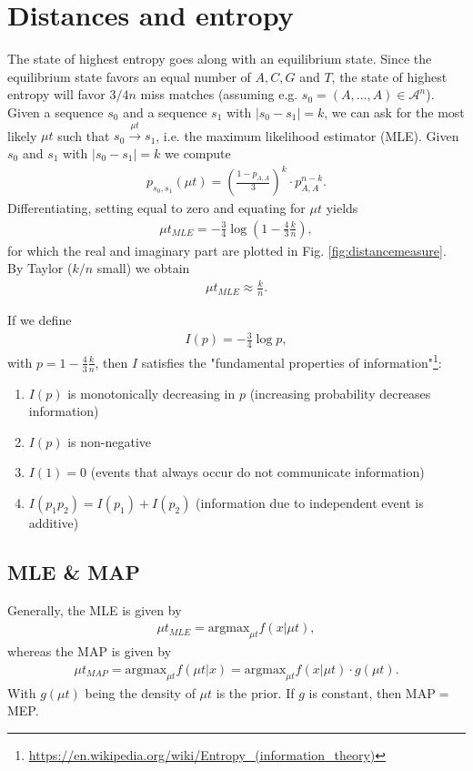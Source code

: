 \documentclass[12pt]{article}
\begin{document}
\section{Distances and entropy}
The state of highest entropy goes along with an equilibrium state. Since the equilibrium state favors an equal number of $A,C,G$ and $T$, the state of highest entropy will favor $3/4n$ miss matches (assuming e.g. $s_0=\left(A,...,A\right)\in\mathcal{A}^n$). Given a sequence $s_0$ and a sequence $s_1$ with $|s_0-s_1| = k$, we can ask for the most likely $\mu t$ such that $s_0 \xrightarrow{\mu t} s_1$, i.e. the maximum likelihood estimator (MLE). Given  $s_0$ and $s_1$ with $|s_0-s_1| = k$ we compute 
\begin{align*}
	p_{s_0,s_1}(\mu t)= \left(\frac{1-p_{A,A}}{3}\right)^k \cdot p_{A,A}^{n-k}.
\end{align*}
Differentiating, setting equal to zero and equating for $\mu t$ yields
\begin{align}
	\mu t_{MLE} = -\frac34 \log \left(1-\frac43 \frac{k}{n}\right),
\end{align}
for which the real and imaginary part are plotted in Fig. \ref{fig:distancemeasure}.
By Taylor ($k/n$ small) we obtain
\begin{align}
\mu t_{MLE} \approx \frac{k}{n}.
\end{align}

If we define 
\begin{align}
	I(p) = -\frac34 \log p,
\end{align}
with $p=1-\frac43\frac{k}{n}$, then $I$ satisfies the "fundamental properties of information"\footnote{\url{https://en.wikipedia.org/wiki/Entropy_(information_theory)}}:
\begin{enumerate}
	\item $I(p)$ is monotonically decreasing in $p$ (increasing probability decreases information)
	\item $I(p)$ is non-negative 
	\item $I(1)=0$ (events that always occur do not communicate information)
	\item $I(p_1 p_2) = I(p_1)+I(p_2)$ (information due to independent event is additive)
\end{enumerate}
\subsection{MLE \& MAP}
Generally, the MLE is given by
\begin{align}
	\mu t_{MLE} = \text{argmax}_{\mu t} f(x | \mu t), 
\end{align}
whereas the MAP is given by
\begin{align}
		\mu t_{MAP} = \text{argmax}_{\mu t} f(\mu t | x) =\text{argmax}_{\mu t} f(x | \mu t) \cdot g(\mu t).
\end{align}
With $g(\mu t)$ being the density of $\mu t$ is the prior. If $g$ is constant, then MAP$=$MEP.
\end{document}
